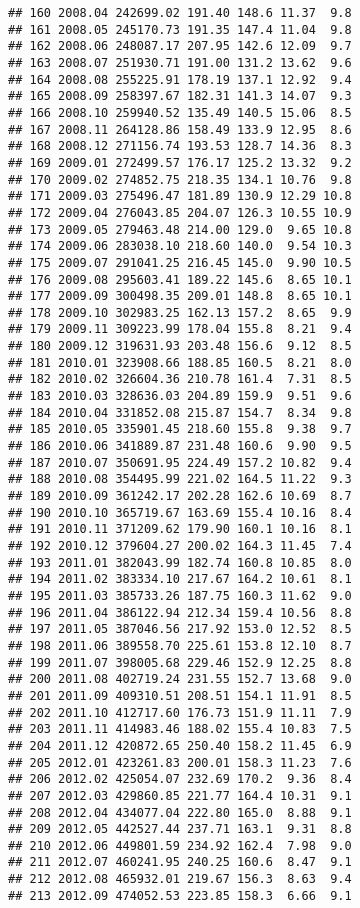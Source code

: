 \documentclass[]{article}
\begin{document}
\begin{verbatim}
## 160 2008.04 242699.02 191.40 148.6 11.37  9.8
## 161 2008.05 245170.73 191.35 147.4 11.04  9.8
## 162 2008.06 248087.17 207.95 142.6 12.09  9.7
## 163 2008.07 251930.71 191.00 131.2 13.62  9.6
## 164 2008.08 255225.91 178.19 137.1 12.92  9.4
## 165 2008.09 258397.67 182.31 141.3 14.07  9.3
## 166 2008.10 259940.52 135.49 140.5 15.06  8.5
## 167 2008.11 264128.86 158.49 133.9 12.95  8.6
## 168 2008.12 271156.74 193.53 128.7 14.36  8.3
## 169 2009.01 272499.57 176.17 125.2 13.32  9.2
## 170 2009.02 274852.75 218.35 134.1 10.76  9.8
## 171 2009.03 275496.47 181.89 130.9 12.29 10.8
## 172 2009.04 276043.85 204.07 126.3 10.55 10.9
## 173 2009.05 279463.48 214.00 129.0  9.65 10.8
## 174 2009.06 283038.10 218.60 140.0  9.54 10.3
## 175 2009.07 291041.25 216.45 145.0  9.90 10.5
## 176 2009.08 295603.41 189.22 145.6  8.65 10.1
## 177 2009.09 300498.35 209.01 148.8  8.65 10.1
## 178 2009.10 302983.25 162.13 157.2  8.65  9.9
## 179 2009.11 309223.99 178.04 155.8  8.21  9.4
## 180 2009.12 319631.93 203.48 156.6  9.12  8.5
## 181 2010.01 323908.66 188.85 160.5  8.21  8.0
## 182 2010.02 326604.36 210.78 161.4  7.31  8.5
## 183 2010.03 328636.03 204.89 159.9  9.51  9.6
## 184 2010.04 331852.08 215.87 154.7  8.34  9.8
## 185 2010.05 335901.45 218.60 155.8  9.38  9.7
## 186 2010.06 341889.87 231.48 160.6  9.90  9.5
## 187 2010.07 350691.95 224.49 157.2 10.82  9.4
## 188 2010.08 354495.99 221.02 164.5 11.22  9.3
## 189 2010.09 361242.17 202.28 162.6 10.69  8.7
## 190 2010.10 365719.67 163.69 155.4 10.16  8.4
## 191 2010.11 371209.62 179.90 160.1 10.16  8.1
## 192 2010.12 379604.27 200.02 164.3 11.45  7.4
## 193 2011.01 382043.99 182.74 160.8 10.85  8.0
## 194 2011.02 383334.10 217.67 164.2 10.61  8.1
## 195 2011.03 385733.26 187.75 160.3 11.62  9.0
## 196 2011.04 386122.94 212.34 159.4 10.56  8.8
## 197 2011.05 387046.56 217.92 153.0 12.52  8.5
## 198 2011.06 389558.70 225.61 153.8 12.10  8.7
## 199 2011.07 398005.68 229.46 152.9 12.25  8.8
## 200 2011.08 402719.24 231.55 152.7 13.68  9.0
## 201 2011.09 409310.51 208.51 154.1 11.91  8.5
## 202 2011.10 412717.60 176.73 151.9 11.11  7.9
## 203 2011.11 414983.46 188.02 155.4 10.83  7.5
## 204 2011.12 420872.65 250.40 158.2 11.45  6.9
## 205 2012.01 423261.83 200.01 158.3 11.23  7.6
## 206 2012.02 425054.07 232.69 170.2  9.36  8.4
## 207 2012.03 429860.85 221.77 164.4 10.31  9.1
## 208 2012.04 434077.04 222.80 165.0  8.88  9.1
## 209 2012.05 442527.44 237.71 163.1  9.31  8.8
## 210 2012.06 449801.59 234.92 162.4  7.98  9.0
## 211 2012.07 460241.95 240.25 160.6  8.47  9.1
## 212 2012.08 465932.01 219.67 156.3  8.63  9.4
## 213 2012.09 474052.53 223.85 158.3  6.66  9.1

\end{verbatim}
\end{document}
